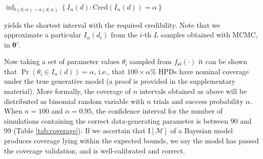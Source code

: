 \documentclass[oneside]{article}
\begin{document}
\begin{center}
  \hspace{0cm}
  $\inf_{b(d, \alpha)-a(d, \alpha)} \left \{ I_\alpha(d) : \text{Cred}(I_\alpha(d)) = \alpha \right\}$
\end{center}



\noindent yields the shortest interval with the required credibility.
Note that we approximate a particular $I_\alpha(d_i)$ from the $i$-th $L$ samples obtained with MCMC, in $\boldsymbol{\theta}'$.

Now taking a set of parameter values $\theta_i$ sampled from $f_\Theta(\cdot)$
it can be shown that
$\operatorname{Pr}\left(\theta_i \in I_\alpha(d) \right) = \alpha$, i.e., that $100\times\alpha$\% HPDs
have nominal coverage under the true generative model (a proof is
provided in the supplementary material).
More formally, the coverage of $n$ intervals obtained as above will be distributed as binomial random variable with $n$ trials and success probability $\alpha$.
When $n=100$ and $\alpha = 0.95$, the confidence interval for the number of simulations containing the correct data-generating parameter is between $90$ and $99$ (Table \ref{tab:coverage}).
If we ascertain that $\text{I}[\mathcal{M}]$ of a Bayesian model produces coverage lying within the expected bounds, we say the model has passed the coverage validation, and is well-calibrated and correct.

%   
\end{document}
